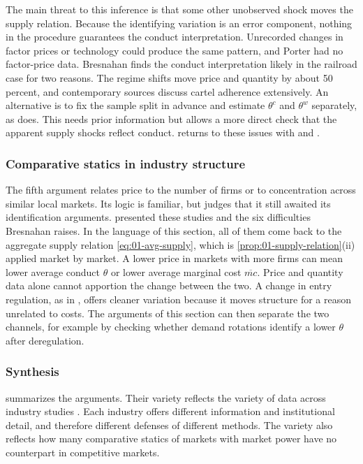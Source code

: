 The main threat to this inference is that some other unobserved shock moves the supply relation. Because the
identifying variation is an error component, nothing in the procedure guarantees the conduct interpretation. Unrecorded
changes in factor prices or technology could produce the same pattern, and Porter had no factor-price data. Bresnahan
finds the conduct interpretation likely in the railroad case for two reasons. The regime shifts move price and quantity
by about 50 percent, and contemporary sources discuss cartel adherence extensively. An alternative is to fix the sample
split in advance and estimate $\theta^{c}$ and $\theta^{w}$ separately, as \citet{Bresnahan1987} does. This needs prior
information but allows a more direct check that the apparent supply shocks reflect conduct. 
returns to these issues with \citet{Porter1983} and \citet{Ellison1994}.

\subsubsection{Comparative statics in industry structure}\label{sec:01-id-structure}

The fifth argument relates price to the number of firms or to concentration across similar local markets. Its logic is
familiar, but \citet[p.~1032]{Bresnahan1989} judges that it still awaited its identification arguments.
 presented these studies and the six difficulties Bresnahan raises. In the language of
this section, all of them come back to the aggregate supply relation \eqref{eq:01-avg-supply}, which is
\cref{prop:01-supply-relation}(ii) applied market by market. A lower price in markets with more firms can mean lower
average conduct $\theta$ or lower average marginal cost $\overline{mc}$. Price and quantity data alone cannot apportion
the change between the two. A change in entry regulation, as in \citet{SpillerFavaro1984}, offers cleaner
variation because it moves structure for a reason unrelated to costs. The arguments of this section can then separate
the two channels, for example by checking whether demand rotations identify a lower $\theta$ after deregulation.

\subsubsection{Synthesis}\label{sec:01-id-synthesis}

 summarizes the arguments. Their variety reflects the variety of data across industry
studies \citep[Section~3.6]{Bresnahan1989}. Each industry offers different information and institutional detail, and
therefore different defenses of different methods. The variety also reflects how many comparative statics of markets
with market power have no counterpart in competitive markets.

